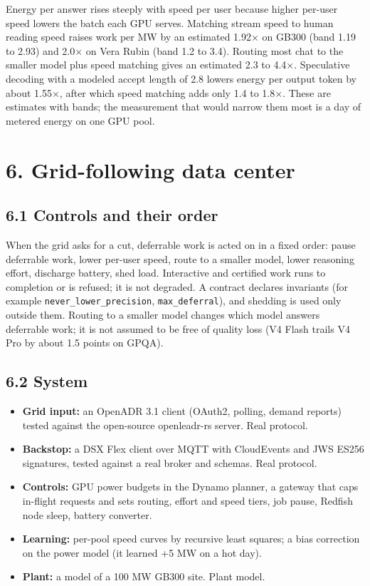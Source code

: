 \documentclass[10pt,letterpaper]{article}
\providecommand{\tightlist}{\setlength{\itemsep}{1pt}\setlength{\parskip}{0pt}}
\begin{document}
Energy per answer rises steeply with speed per user because higher
per-user speed lowers the batch each GPU serves. Matching stream speed
to human reading speed raises work per MW by an estimated 1.92× on GB300
(band 1.19 to 2.93) and 2.0× on Vera Rubin (band 1.2 to 3.4). Routing
most chat to the smaller model plus speed matching gives an estimated
2.3 to 4.4×. Speculative decoding with a modeled accept length of 2.8
lowers energy per output token by about 1.55×, after which speed
matching adds only 1.4 to 1.8×. These are estimates with bands; the
measurement that would narrow them most is a day of metered energy on
one GPU pool.

\section{6. Grid-following data
center}\label{grid-following-data-center}

\subsection{6.1 Controls and their
order}\label{controls-and-their-order}

When the grid asks for a cut, deferrable work is acted on in a fixed
order: pause deferrable work, lower per-user speed, route to a smaller
model, lower reasoning effort, discharge battery, shed load. Interactive
and certified work runs to completion or is refused; it is not degraded.
A contract declares invariants (for example
\texttt{never\_\allowbreak{}lower\_\allowbreak{}precision}, \texttt{max\_deferral}), and shedding
is used only outside them. Routing to a smaller model changes which
model answers deferrable work; it is not assumed to be free of quality
loss (V4 Flash trails V4 Pro by about 1.5 points on GPQA).

\subsection{6.2 System}\label{system}

\begin{itemize}
\tightlist
\item
  \textbf{Grid input:} an OpenADR 3.1 client (OAuth2, polling, demand
  reports) tested against the open-source openleadr-rs server. Real
  protocol.
\item
  \textbf{Backstop:} a DSX Flex client over MQTT with CloudEvents and
  JWS ES256 signatures, tested against a real broker and schemas. Real
  protocol.
\item
  \textbf{Controls:} GPU power budgets in the Dynamo planner, a gateway
  that caps in-flight requests and sets routing, effort and speed tiers,
  job pause, Redfish node sleep, battery converter.
\item
  \textbf{Learning:} per-pool speed curves by recursive least squares; a
  bias correction on the power model (it learned +5 MW on a hot day).
\item
  \textbf{Plant:} a model of a 100 MW GB300 site. Plant model.
\end{itemize}
\end{document}
